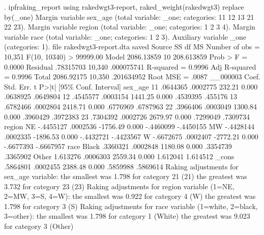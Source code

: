 . ipfraking_report using rakedwgt3-report, raked_weight(rakedwgt3) replace by(_one)
Margin variable sex_age (total variable: _one; categories: 11 12 13 21 22 23).
Margin variable region (total variable: _one; categories: 1 2 3 4).
Margin variable race (total variable: _one; categories: 1 2 3).
Auxiliary variable _one (categories: 1).
{\smallskip}
file rakedwgt3-report.dta saved
{\smallskip}
      Source {\VBAR}       SS           df       MS      Number of obs   =    10,351
   F(10, 10340)    >  99999.00
       Model {\VBAR}  2086.13859        10  208.613859   Prob > F        =    0.0000
    Residual {\VBAR}   .78315703    10,340  .000075741   R-squared       =    0.9996
   Adj R-squared   =    0.9996
       Total {\VBAR}  2086.92175    10,350  .201634952   Root MSE        =     .0087
{\smallskip}
    __000003 {\VBAR}      Coef.   Std. Err.      t    P>|t|     [95\% Conf. Interval]
     sex_age {\VBAR}
         11  {\VBAR}   .0644365   .0002775   232.21   0.000     .0638925    .0649804
         12  {\VBAR}   .4545577   .0003154  1441.25   0.000     .4539395     .455176
         13  {\VBAR}   .6782466   .0002804  2418.71   0.000     .6776969    .6787963
         22  {\VBAR}   .3966406   .0003049  1300.84   0.000     .3960429    .3972383
         23  {\VBAR}   .7304392   .0002726  2679.97   0.000     .7299049    .7309734
             {\VBAR}
      region {\VBAR}
         NE  {\VBAR}  -.4455127   .0002536 -1756.49   0.000    -.4460099   -.4450155
         MW  {\VBAR}  -.4428144   .0002335 -1896.53   0.000    -.4432721   -.4423567
          W  {\VBAR}  -.6672675   .0002407 -2772.21   0.000    -.6677393   -.6667957
             {\VBAR}
        race {\VBAR}
      Black  {\VBAR}   .3360321   .0002848  1180.08   0.000     .3354739    .3365902
      Other  {\VBAR}   1.613276   .0006303  2559.34   0.000     1.612041    1.614512
             {\VBAR}
       _cons {\VBAR}   .5864801   .0002455  2388.48   0.000     .5859988    .5869614
{\smallskip}
Raking adjustments for sex_age variable:
  the smallest was        1.798 for category 21 (21)
  the greatest was        3.732 for category 23 (23)
Raking adjustments for region variable (1=NE, 2=MW, 3=S, 4=W):
  the smallest was        0.922 for category 4 (W)
  the greatest was        1.798 for category 3 (S)
Raking adjustments for race variable (1=white, 2=black, 3=other):
  the smallest was        1.798 for category 1 (White)
  the greatest was        9.023 for category 3 (Other)
